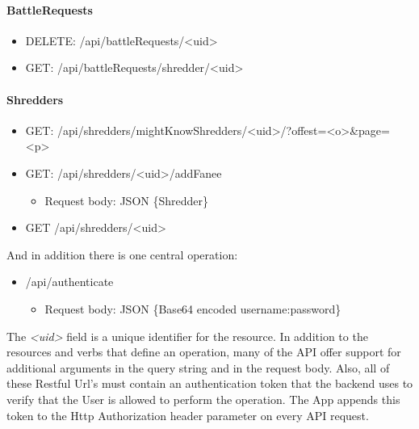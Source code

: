 \paragraph{BattleRequests}
\begin{itemize}
\item{} DELETE: /api/battleRequests/<uid>
\item{} GET: /api/battleRequests/shredder/<uid>
\end{itemize}

\paragraph{Shredders}
\begin{itemize}
\item{} GET: /api/shredders/mightKnowShredders/<uid>/?offest=<o>\&page=<p>
\item{} GET: /api/shredders/<uid>/addFanee
	\begin{itemize}
	\item{} Request body: JSON \{Shredder\}
	\end{itemize}
\item{} GET /api/shredders/<uid>
\end{itemize}

And in addition there is one central operation:
\begin{itemize}
\item{} /api/authenticate
	\begin{itemize}
	\item{} Request body: JSON \{Base64 encoded username:password\}
	\end{itemize}
\end{itemize}

The \textit{<uid>} field is a unique identifier for the resource. In addition to the resources and verbs that define an operation, many of the API offer support for additional arguments in the query string and in the request body. Also, all of these Restful Url's must contain an authentication token that the backend uses to verify that the User is allowed to perform the operation. The App appends this token to the Http Authorization header parameter on every API request. 

